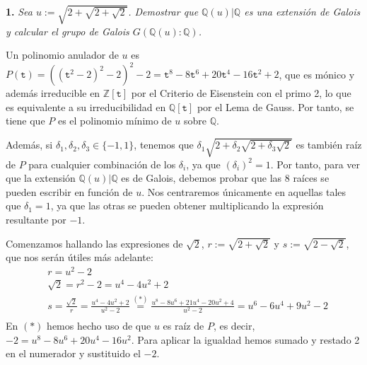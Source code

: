 
\textbf{1.} \textit{Sea $u := \sqrt{2+\sqrt{2+\sqrt{2}}}$. Demostrar que $\mathbb{Q}(u)|\mathbb{Q}$ es una extensión de Galois y calcular el grupo de Galois $G(\mathbb{Q}(u):\mathbb{Q})$.}

Un polinomio anulador de $u$ es $P(\mathtt{t}) = \left(\left( \mathtt{t}^2-2\right)^2-2\right)^2-2 = \mathtt{t}^8-8\mathtt{t}^6+20\mathtt{t}^4-16\mathtt{t}^2+2$, que es mónico y además irreducible en $\mathbb{Z}[ \mathtt{t}] $ por el Criterio de Eisenstein con el primo 2, lo que es equivalente a su irreducibilidad en $\mathbb{Q}[\mathtt{t}]$ por el Lema de Gauss. Por tanto, se tiene que $P$ es el polinomio mínimo de $u$ sobre $\mathbb{Q}$.

Además, si $\delta_1, \delta_2, \delta_3 \in \{-1,1\}$, tenemos que $\delta_1\sqrt{2+\delta_2\sqrt{2+\delta_3\sqrt{2}}}$ es también raíz de $P$ para cualquier combinación de los $\delta_i$, ya que $(\delta_i)^2 = 1$. Por tanto, para ver que la extensión $\mathbb{Q}(u)|\mathbb{Q}$ es de Galois, debemos probar que las 8 raíces se pueden escribir en función de $u$. Nos centraremos únicamente en aquellas tales que $\delta_1 = 1$, ya que las otras se pueden obtener multiplicando la expresión resultante por $-1$.

Comenzamos hallando las expresiones de $\sqrt{2}$, $r := \sqrt{2+\sqrt{2}}$ y $s := \sqrt{2-\sqrt{2}}$, que nos serán útiles más adelante:
\begin{equation*}
\begin{split}
&r = u^2-2\\
&\sqrt{2} = r^2-2 = u^4-4u^2+2\\
& s = \frac{\sqrt{2}}{r} = \frac{u^4-4u^2+2}{u^2-2} \stackrel{(*)}{=} \frac{u^8-8u^6+21u^4-20u^2+4}{u^2-2} = u^6-6u^4+9u^2-2\\
\end{split}
\end{equation*}
En $(*)$ hemos hecho uso de que $u$ es raíz de $P$, es decir, $-2 = u^8-8u^6+20u^4-16u^2$. Para aplicar la igualdad hemos sumado y restado 2 en el numerador y sustituido el $-2$.

